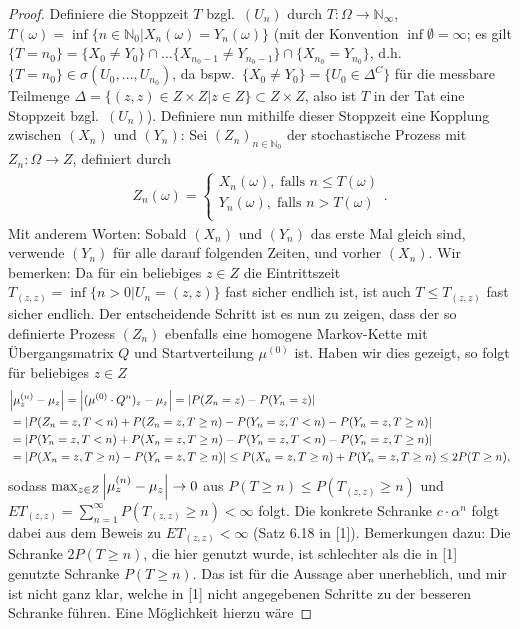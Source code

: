 \documentclass[twoside]{article}
\theoremstyle{definition}
\begin{document}
\begin{proof}
Definiere die Stoppzeit $T$ bzgl.\ $(U_n)$ durch $T: \Omega \to \mathbb{N}_{\infty}$, $T(\omega) = \inf\{n \in \mathbb{N}_0 | X_n(\omega) = Y_n(\omega)\}$ (mit der Konvention $\inf \emptyset = \infty$; es gilt $\{T = n_0\} = \{X_0 \neq Y_0\} \cap \dots \{X_{n_0-1} \neq Y_{n_0-1}\} \cap \{X_{n_0} = Y_{n_0}\}$, d.h. $\{T = n_0\} \in \sigma(U_0, \dots, U_{n_0})$, da bspw.\ $\{X_0 \neq Y_0\} = \{U_0 \in \Delta^C\}$ für die messbare Teilmenge $\Delta = \{(z,z) \in Z \times Z|z \in Z\}\subset Z \times Z$, also ist $T$ in der Tat eine Stoppzeit bzgl.\ $(U_n)$). Definiere nun mithilfe dieser Stoppzeit eine Kopplung zwischen $(X_n)$ und $(Y_n)$: Sei $(Z_n)_{n \in \mathbb{N}_0}$ der stochastische Prozess mit $Z_n:\Omega \to Z$, definiert durch
\begin{align}
Z_n(\omega) = \begin{cases}
X_n(\omega), \; \text{falls } n \leq T(\omega)\\
Y_n(\omega), \; \text{falls } n > T(\omega)\\
\end{cases}.
\end{align}
Mit anderem Worten: Sobald $(X_n)$ und $(Y_n)$ das erste Mal gleich sind, verwende $(Y_n)$ für alle darauf folgenden Zeiten, und vorher $(X_n)$. Wir bemerken: Da für ein beliebiges $z \in Z$ die Eintrittszeit $T_{(z,z)} = \inf \{n >0| U_n=(z,z) \}$ fast sicher endlich ist, ist auch $T \leq T_{(z,z)}$ fast sicher endlich. Der entscheidende Schritt ist es nun zu zeigen, dass der so definierte Prozess $(Z_n)$ ebenfalls eine homogene Markov-Kette mit Übergangsmatrix $Q$ und Startverteilung $\mu^{(0)}$ ist. Haben wir dies gezeigt, so folgt für beliebiges $z \in Z$
\begin{align}
&\abs{\mu_z^{(n)}-\mu_z} = \abs{(\mu^{(0)} \cdot Q^n)_z-\mu_z} = \abs{P(Z_n=z)-P(Y_n=z)}\\
&= \abs{P(Z_n=z,T<n) + P(Z_n=z,T \geq n) - P(Y_n=z,T<n) - P(Y_n=z,T \geq n)}\\
&= \abs{P(Y_n=z,T<n) + P(X_n=z,T \geq n) - P(Y_n=z,T<n) - P(Y_n=z,T \geq n)}\\
&= \abs{P(X_n=z,T \geq n) - P(Y_n=z,T \geq n)} \leq P(X_n=z,T \geq n) + P(Y_n=z,T \geq n) \leq 2 P(T \geq n),
\end{align}
sodass $\max_{z \in Z}\abs{\mu_z^{(n)}-\mu_z} \to 0$ aus $P(T \geq n) \leq P(T_{(z,z)} \geq n)$ und $ET_{(z,z)} = \sum_{n=1}^{\infty} P(T_{(z,z)} \geq n) < \infty$ folgt. Die konkrete Schranke $c \cdot \alpha^n$ folgt dabei aus dem Beweis zu $ET_{(z,z)} < \infty$ (Satz 6.18 in [1]). Bemerkungen dazu: Die Schranke $2 P(T \geq n)$, die hier genutzt wurde, ist schlechter als die in [1] genutzte Schranke $P(T \geq n)$. Das ist für die Aussage aber unerheblich, und mir ist nicht ganz klar, welche in [1] nicht angegebenen Schritte zu der besseren Schranke führen. Eine Möglichkeit hierzu wäre

\end{proof}
\end{document}
